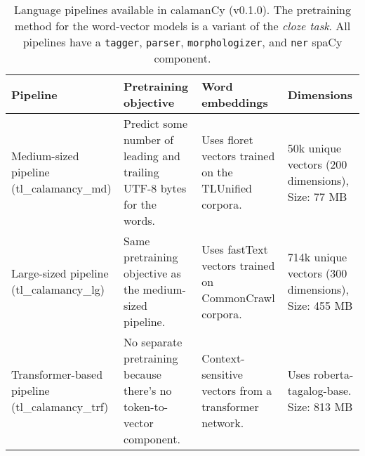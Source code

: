 \documentclass[../report.tex]{subfiles}
\begin{document}
\begin{table*}[t]
\begin{tabular}{@{}p{3cm}p{4cm}p{4cm}p{3.75cm}@{}}
\toprule
Pipeline  &  Pretraining objective & Word embeddings & Dimensions \\ \midrule
Medium-sized pipeline (tl\_calamancy\_md) & Predict some number of leading and trailing UTF-8 bytes for the words. & Uses floret vectors trained on the TLUnified corpora. & 50k unique vectors (200 dimensions), Size: 77 MB\\
Large-sized pipeline (tl\_calamancy\_lg)  & Same pretraining objective as the medium-sized pipeline.    & Uses fastText vectors trained on CommonCrawl corpora.                  & 714k unique vectors (300 dimensions), Size: 455 MB \\
Transformer-based pipeline (tl\_calamancy\_trf) & No separate pretraining because there's no token-to-vector component. & Context-sensitive vectors from a transformer network.      & Uses roberta-tagalog-base. Size: 813 MB  \\ \bottomrule
\end{tabular}
\caption{
    Language pipelines available in calamanCy (v0.1.0).
    The pretraining method for the word-vector models is a variant of the \textit{cloze task}.
    All pipelines have a \texttt{tagger}, \texttt{parser}, \texttt{morphologizer}, and \texttt{ner} spaCy component.
}
\label{table:calamancy_pipelines}
\end{table*}
\end{document}
